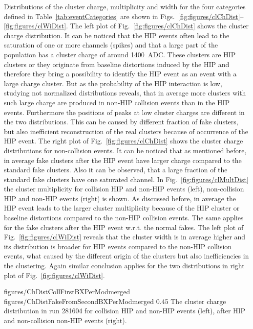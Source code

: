 Distributions of the cluster charge, multiplicity and width for the four categories defined in Table~\ref{tab:eventCategories} are shown in Figs.~\ref{fig:figures/clChDist}--\ref{fig:figures/clWiDist}. The left plot of Fig.~\ref{fig:figures/clChDist} shows the cluster charge distribution. It can be noticed that the HIP events often lead to the saturation of one or more channels (spikes) and that  a large part of the population has a cluster charge of around 1400~ADC. These clusters are HIP clusters or they originate from baseline distortions induced by the HIP and therefore they bring a possibility to identify the HIP event as an event with a large charge cluster. But as the probability of the HIP interaction is low, studying not normalized distributions reveals, that in average more clusters with such large charge are produced in non-HIP collision events than in the HIP events. Furthermore the positions of peaks at low cluster charges are different in the two distributions. This can be caused by different fraction of fake clusters, but also inefficient reconstruction of the real clusters because of occurrence of the HIP event. The right plot of Fig.~\ref{fig:figures/clChDist} shows the cluster charge distributions for non-collision events. It can be noticed that as mentioned before, in average fake clusters after the HIP event have larger charge compared to the standard fake clusters. Also it can be observed, that a large fraction of the standard fake clusters have one saturated channel. In Fig.~\ref{fig:figures/clMultDist} the cluster multiplicity for collision HIP and non-HIP events (left),  non-collision HIP and non-HIP events (right) is shown. As discussed before, in average the HIP event leads to the larger cluster multiplicity because of the HIP cluster or baseline distortions compared to the non-HIP collision events. The same applies for the fake clusters after the HIP event w.r.t. the normal fakes. The left plot of Fig.~\ref{fig:figures/clWiDist} reveals that the cluster width is in average higher and its distribution is broader for HIP events compared to the non-HIP collision events, what caused by the different origin of the clusters but also inefficiencies in the clustering. Again similar conclusion applies for the two distributions in right plot of Fig.~\ref{fig:figures/clWiDist}.  

                 {figures/ChDistCollFirstBXPerModmerged} %
                 {figures/ChDistFakeFromSecondBXPerModmerged} %
                 {0.45}       %
                 { The cluster charge distribution in run 281604 for collision HIP and non-HIP events (left), after HIP and non-collision non-HIP events (right).   } %

